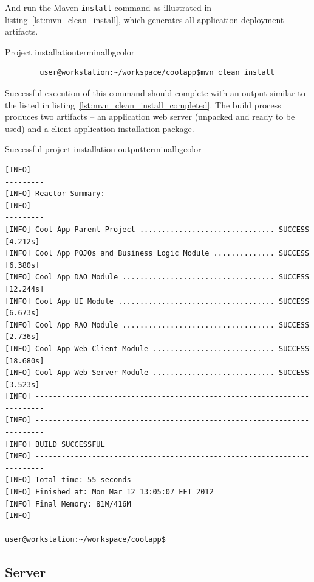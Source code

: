   And run the Maven \texttt{install} command as illustrated in listing~\ref{lst:mvn_clean_install}, which generates all application deployment artifacts.

  \begin{code}{Project installation}{\label{lst:mvn_clean_install}}{terminalbgcolor}
     \begin{lstlisting}
        user@workstation:~/workspace/coolapp$mvn clean install
     \end{lstlisting}
  \end{code}

  Successful execution of this command should complete with an output similar to the listed in listing~\ref{lst:mvn_clean_install_completed}.
  The build process produces two artifacts -- an application web server (unpacked and ready to be used) and a client application installation package.
  
  \begin{code}{Successful project installation output}{\label{lst:mvn_clean_install_completed}}{terminalbgcolor}
      \begin{lstlisting}
[INFO] ------------------------------------------------------------------------
[INFO] Reactor Summary:
[INFO] ------------------------------------------------------------------------
[INFO] Cool App Parent Project ............................... SUCCESS [4.212s]
[INFO] Cool App POJOs and Business Logic Module .............. SUCCESS [6.380s]
[INFO] Cool App DAO Module ................................... SUCCESS [12.244s]
[INFO] Cool App UI Module .................................... SUCCESS [6.673s]
[INFO] Cool App RAO Module ................................... SUCCESS [2.736s]
[INFO] Cool App Web Client Module ............................ SUCCESS [18.680s]
[INFO] Cool App Web Server Module ............................ SUCCESS [3.523s]
[INFO] ------------------------------------------------------------------------
[INFO] ------------------------------------------------------------------------
[INFO] BUILD SUCCESSFUL
[INFO] ------------------------------------------------------------------------
[INFO] Total time: 55 seconds
[INFO] Finished at: Mon Mar 12 13:05:07 EET 2012
[INFO] Final Memory: 81M/416M
[INFO] ------------------------------------------------------------------------
user@workstation:~/workspace/coolapp$ 
      \end{lstlisting}
  \end{code}

\subsection{Server}

